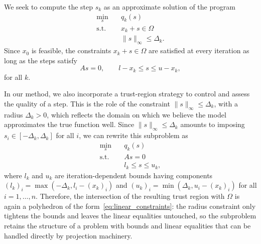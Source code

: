 \documentclass{article}
\numberwithin{equation}{section}
\theoremstyle{plain}
\begin{document}
We seek to compute the step $s_k$ as an approximate solution of the program
\begin{align*}
	\min_{s} \quad& q_k(s)  \\
	\text{s.t.}  \quad & x_k+s \in \Omega \\ 
	& \|s\|_\infty \le \Delta_k.
\end{align*}	
Since $x_0$ is feasible, the constraints $x_k+s\in \Omega$ are satisfied at every iteration as long as the steps satisfy
\[As = 0, \qquad l - x_k \le s \le u-x_k,\]
for all $k$.

In our method, we also incorporate a trust-region strategy to control and assess the quality of a step. This is the role of the constraint $\|s\|_\infty \le \Delta_k$, with a radius $\Delta_k > 0$, which reflects the domain on which we believe the model approximates the true function well. Since $\|s\|_\infty \le \Delta_k$ amounts to imposing $s_i \in [-\Delta_k,\Delta_k]$ for all $i$, we can rewrite this subproblem as
\begin{subequations}\label{pb:quadratic_subproblem} 
	\begin{align}
		\min_{s} \quad& q_k(s)  \\
		\text{s.t.}  \quad & As=0 \\
		& l_k \le s \le u_k,
	\end{align}	
\end{subequations}
where $l_k$ and $u_k$ are iteration-dependent bounds having components $(l_k)_i = \max\left(-\Delta_k,l_i-(x_k)_i\right)$ and $(u_k)_i = \min\left(\Delta_k,u_i-(x_k)_i\right)$ for all $i=1,\ldots,n$. Therefore, the intersection of the resulting trust region with $\Omega$ is again a polyhedron of the form~\eqref{eq:linear_constraints}: the radius constraint only tightens the bounds and leaves the linear equalities untouched, so the subproblem retains the structure of a problem with bounds and linear equalities that can be handled directly by projection machinery.
\end{document}
